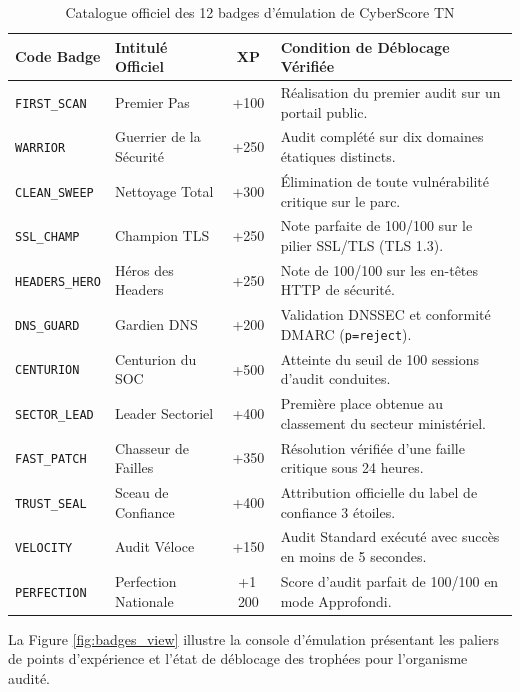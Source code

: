 \begin{table}[!htbp]
\centering
\caption{Catalogue officiel des 12 badges d'émulation de CyberScore TN}
\label{tab:gamification_badges}
\begin{singlespace}
\footnotesize
\renewcommand{\arraystretch}{1.08}
\begin{tabularx}{\textwidth}{l l c X}
\toprule
\textbf{Code Badge} & \textbf{Intitulé Officiel} & \textbf{XP} & \textbf{Condition de Déblocage Vérifiée} \\
\midrule
\texttt{FIRST\_SCAN} & Premier Pas & +100 & Réalisation du premier audit sur un portail public. \\
\texttt{WARRIOR} & Guerrier de la Sécurité & +250 & Audit complété sur dix domaines étatiques distincts. \\
\texttt{CLEAN\_SWEEP} & Nettoyage Total & +300 & Élimination de toute vulnérabilité critique sur le parc. \\
\texttt{SSL\_CHAMP} & Champion TLS & +250 & Note parfaite de 100/100 sur le pilier SSL/TLS (TLS 1.3). \\
\texttt{HEADERS\_HERO} & Héros des Headers & +250 & Note de 100/100 sur les en-têtes HTTP de sécurité. \\
\texttt{DNS\_GUARD} & Gardien DNS & +200 & Validation DNSSEC et conformité DMARC (\texttt{p=reject}). \\
\texttt{CENTURION} & Centurion du SOC & +500 & Atteinte du seuil de 100 sessions d'audit conduites. \\
\texttt{SECTOR\_LEAD} & Leader Sectoriel & +400 & Première place obtenue au classement du secteur ministériel. \\
\texttt{FAST\_PATCH} & Chasseur de Failles & +350 & Résolution vérifiée d'une faille critique sous 24 heures. \\
\texttt{TRUST\_SEAL} & Sceau de Confiance & +400 & Attribution officielle du label de confiance 3 étoiles. \\
\texttt{VELOCITY} & Audit Véloce & +150 & Audit Standard exécuté avec succès en moins de 5 secondes. \\
\texttt{PERFECTION} & Perfection Nationale & +1\,200 & Score d'audit parfait de 100/100 en mode Approfondi. \\
\bottomrule
\end{tabularx}
\end{singlespace}
\end{table}

La Figure \ref{fig:badges_view} illustre la console d'émulation présentant les paliers de points d'expérience et l'état de déblocage des trophées pour l'organisme audité.

